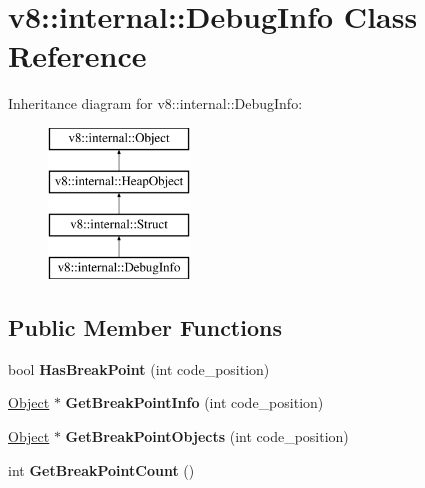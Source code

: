 \hypertarget{classv8_1_1internal_1_1_debug_info}{}\section{v8\+:\+:internal\+:\+:Debug\+Info Class Reference}
\label{classv8_1_1internal_1_1_debug_info}
Inheritance diagram for v8\+:\+:internal\+:\+:Debug\+Info\+:\begin{figure}[H]
\begin{center}
\leavevmode
\includegraphics[height=4.000000cm]{classv8_1_1internal_1_1_debug_info}
\end{center}
\end{figure}
\subsection*{Public Member Functions}
\begin{DoxyCompactItemize}
\item 
\hypertarget{classv8_1_1internal_1_1_debug_info_af3a19de45a83584bfaeb19f8b3b18897}{}bool {\bfseries Has\+Break\+Point} (int code\+\_\+position)\label{classv8_1_1internal_1_1_debug_info_af3a19de45a83584bfaeb19f8b3b18897}

\item 
\hypertarget{classv8_1_1internal_1_1_debug_info_a9aafcbb152c46a6f0c04a7319a2e086c}{}\hyperlink{classv8_1_1internal_1_1_object}{Object} $\ast$ {\bfseries Get\+Break\+Point\+Info} (int code\+\_\+position)\label{classv8_1_1internal_1_1_debug_info_a9aafcbb152c46a6f0c04a7319a2e086c}

\item 
\hypertarget{classv8_1_1internal_1_1_debug_info_aef6302d3b6449797e10ca4359b418704}{}\hyperlink{classv8_1_1internal_1_1_object}{Object} $\ast$ {\bfseries Get\+Break\+Point\+Objects} (int code\+\_\+position)\label{classv8_1_1internal_1_1_debug_info_aef6302d3b6449797e10ca4359b418704}

\item 
\hypertarget{classv8_1_1internal_1_1_debug_info_ae63dfb49054ac553acfd8cb94bab6bba}{}int {\bfseries Get\+Break\+Point\+Count} ()\label{classv8_1_1internal_1_1_debug_info_ae63dfb49054ac553acfd8cb94bab6bba}

\end{DoxyCompactItemize}
